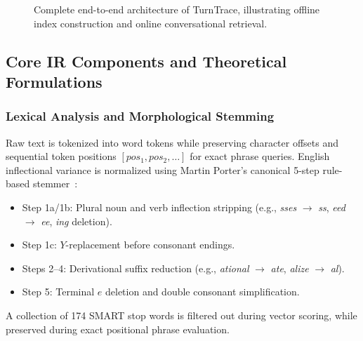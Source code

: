 \documentclass[10pt,a4paper,twocolumn]{article}
\begin{document}
\begin{figure}[t]
\caption{Complete end-to-end architecture of TurnTrace, illustrating offline index construction and online conversational retrieval.}
\label{fig:pipeline}
\end{figure}

\subsection{Core IR Components and Theoretical Formulations}

\subsubsection{Lexical Analysis and Morphological Stemming}
Raw text is tokenized into word tokens while preserving character offsets and sequential token positions $[pos_1, pos_2, \dots]$ for exact phrase queries. English inflectional variance is normalized using Martin Porter's canonical 5-step rule-based stemmer~\cite{porter1980algorithm}:
\begin{itemize}
    \item Step 1a/1b: Plural noun and verb inflection stripping (e.g., \textit{sses} $\to$ \textit{ss}, \textit{eed} $\to$ \textit{ee}, \textit{ing} deletion).
    \item Step 1c: $Y$-replacement before consonant endings.
    \item Steps 2--4: Derivational suffix reduction (e.g., \textit{ational} $\to$ \textit{ate}, \textit{alize} $\to$ \textit{al}).
    \item Step 5: Terminal $e$ deletion and double consonant simplification.
\end{itemize}
A collection of 174 SMART stop words is filtered out during vector scoring, while preserved during exact positional phrase evaluation.
\end{document}
